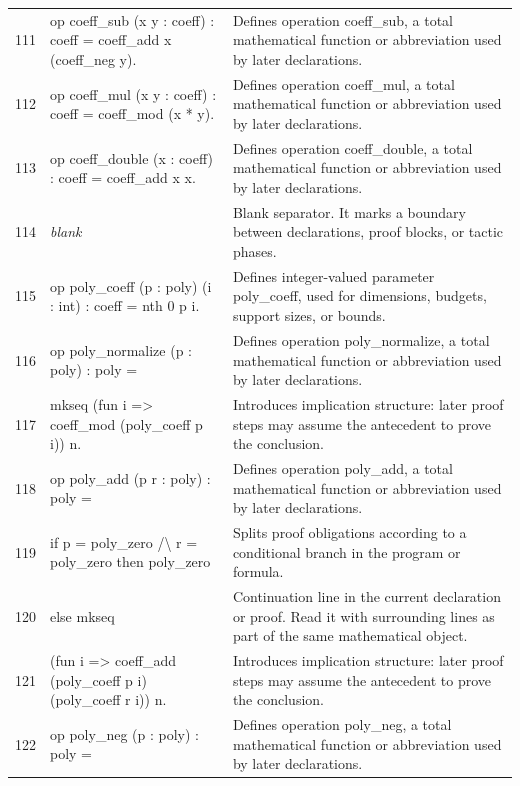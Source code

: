 \documentclass[10pt]{article}
\begin{document}
\begin{longtable}{r L{0.53\textwidth} L{0.37\textwidth}}
111 & {\ttfamily\scriptsize op coeff\_sub (x y : coeff) : coeff = coeff\_add x (coeff\_neg y).} & Defines operation coeff\_sub, a total mathematical function or abbreviation used by later declarations. \\
112 & {\ttfamily\scriptsize op coeff\_mul (x y : coeff) : coeff = coeff\_mod (x * y).} & Defines operation coeff\_mul, a total mathematical function or abbreviation used by later declarations. \\
113 & {\ttfamily\scriptsize op coeff\_double (x : coeff) : coeff = coeff\_add x x.} & Defines operation coeff\_double, a total mathematical function or abbreviation used by later declarations. \\
114 & {\ttfamily\scriptsize \emph{blank}} & Blank separator.  It marks a boundary between declarations, proof blocks, or tactic phases. \\
115 & {\ttfamily\scriptsize op poly\_coeff (p : poly) (i : int) : coeff = nth 0 p i.} & Defines integer-valued parameter poly\_coeff, used for dimensions, budgets, support sizes, or bounds. \\
116 & {\ttfamily\scriptsize op poly\_normalize (p : poly) : poly =} & Defines operation poly\_normalize, a total mathematical function or abbreviation used by later declarations. \\
117 & {\ttfamily\scriptsize   mkseq (fun i => coeff\_mod (poly\_coeff p i)) n.} & Introduces implication structure: later proof steps may assume the antecedent to prove the conclusion. \\
118 & {\ttfamily\scriptsize op poly\_add (p r : poly) : poly =} & Defines operation poly\_add, a total mathematical function or abbreviation used by later declarations. \\
119 & {\ttfamily\scriptsize   if p = poly\_zero /\textbackslash{} r = poly\_zero then poly\_zero} & Splits proof obligations according to a conditional branch in the program or formula. \\
120 & {\ttfamily\scriptsize   else mkseq} & Continuation line in the current declaration or proof.  Read it with surrounding lines as part of the same mathematical object. \\
121 & {\ttfamily\scriptsize     (fun i => coeff\_add (poly\_coeff p i) (poly\_coeff r i)) n.} & Introduces implication structure: later proof steps may assume the antecedent to prove the conclusion. \\
122 & {\ttfamily\scriptsize op poly\_neg (p : poly) : poly =} & Defines operation poly\_neg, a total mathematical function or abbreviation used by later declarations. \\

\end{longtable}
\end{document}
